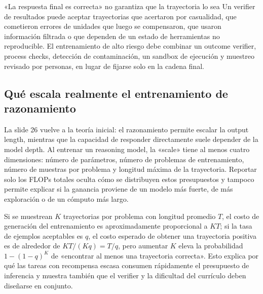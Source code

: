 
\begin{warningbox}{«La respuesta final es correcta» no garantiza que la trayectoria lo sea}
Un verifier de resultados puede aceptar trayectorias que acertaron por casualidad, que cometieron errores de unidades que luego se compensaron, que usaron información filtrada o que dependen de un estado de herramientas no reproducible. El entrenamiento de alto riesgo debe combinar un outcome verifier, process checks, detección de contaminación, un sandbox de ejecución y muestreo revisado por personas, en lugar de fijarse solo en la cadena final.
\end{warningbox}


\subsection{Qué escala realmente el entrenamiento de razonamiento}

La slide 26 vuelve a la teoría inicial: el razonamiento permite escalar la output length, mientras que la capacidad de responder directamente suele depender de la model depth. Al entrenar un reasoning model, la «scale» tiene al menos cuatro dimensiones: número de parámetros, número de problemas de entrenamiento, número de muestras por problema y longitud máxima de la trayectoria. Reportar solo los FLOPs totales oculta cómo se distribuyen estos presupuestos y tampoco permite explicar si la ganancia proviene de un modelo más fuerte, de más exploración o de un cómputo más largo.


Si se muestrean $K$ trayectorias por problema con longitud promedio $T$, el costo de generación del entrenamiento es aproximadamente proporcional a $KT$; si la tasa de ejemplos aceptables es $q$, el costo esperado de obtener una trayectoria positiva es de alrededor de $KT/(Kq)=T/q$, pero aumentar $K$ eleva la probabilidad $1-(1-q)^K$ de «encontrar al menos una trayectoria correcta». Esto explica por qué las tareas con recompensa escasa consumen rápidamente el presupuesto de inferencia y muestra también que el verifier y la dificultad del currículo deben diseñarse en conjunto.

